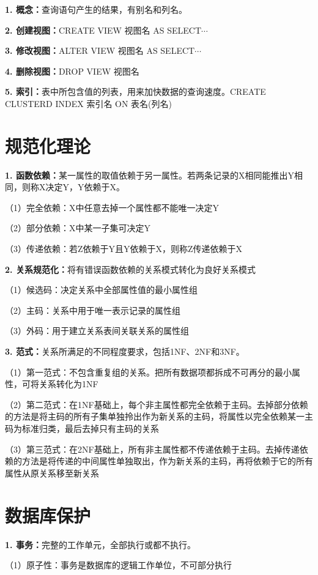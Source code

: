 \textbf{1. 概念：}查询语句产生的结果，有别名和列名。

\textbf{2. 创建视图：}CREATE VIEW 视图名 AS SELECT$\cdots$

\textbf{3. 修改视图：}ALTER VIEW 视图名 AS SELECT$\cdots$

\textbf{4. 删除视图：}DROP VIEW 视图名

\textbf{5. 索引：}表中所包含值的列表，用来加快数据的查询速度。CREATE {CLUSTERD} INDEX 索引名 ON 表名(列名)

\section{规范化理论}

\textbf{1. 函数依赖：}某一属性的取值依赖于另一属性。若两条记录的X相同能推出Y相同，则称X决定Y，Y依赖于X。

\quad（1）完全依赖：X中任意去掉一个属性都不能唯一决定Y

\quad（2）部分依赖：X中某一子集可决定Y

\quad（3）传递依赖：若Z依赖于Y且Y依赖于X，则称Z传递依赖于X

\textbf{2. 关系规范化：}将有错误函数依赖的关系模式转化为良好关系模式

\quad（1）候选码：决定关系中全部属性值的最小属性组

\quad（2）主码：关系中用于唯一表示记录的属性组

\quad（3）外码：用于建立关系表间关联关系的属性组

\textbf{3. 范式：}关系所满足的不同程度要求，包括1NF、2NF和3NF。

\quad（1）第一范式：不包含重复组的关系。把所有数据项都拆成不可再分的最小属性，可将关系转化为1NF

\quad（2）第二范式：在1NF基础上，每个非主属性都完全依赖于主码。去掉部分依赖的方法是将主码的所有子集单独拎出作为新关系的主码，将属性以完全依赖某一主码为标准归类，最后去掉只有主码的关系

\quad（3）第三范式：在2NF基础上，所有非主属性都不传递依赖于主码。去掉传递依赖的方法是将传递的中间属性单独取出，作为新关系的主码，再将依赖于它的所有属性从原关系移至新关系

\section{数据库保护}

\textbf{1. 事务：}完整的工作单元，全部执行或都不执行。

\quad（1）原子性：事务是数据库的逻辑工作单位，不可部分执行

